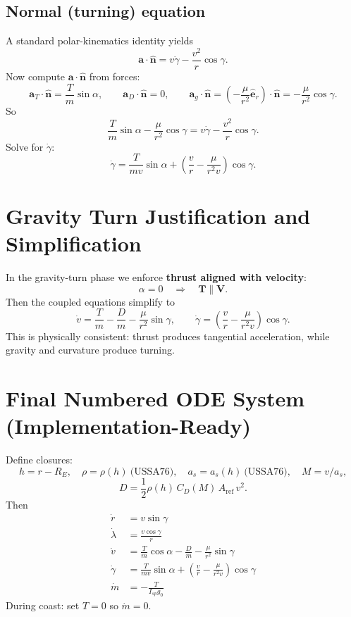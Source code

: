 \documentclass[11pt]{article}
\begin{document}
\subsection{Normal (turning) equation}
A standard polar-kinematics identity yields
\begin{equation}
\bm{a}\cdot\hat{\bm n}=v\dot\gamma-\frac{v^2}{r}\cos\gamma.
\end{equation}
Now compute $\bm{a}\cdot\hat{\bm n}$ from forces:
\[
\bm{a}_T\cdot\hat{\bm n}=\frac{T}{m}\sin\alpha,\qquad
\bm{a}_D\cdot\hat{\bm n}=0,\qquad
\bm{a}_g\cdot\hat{\bm n}=\left(-\frac{\mu}{r^2}\hat{\bm e}_r\right)\cdot\hat{\bm n}=-\frac{\mu}{r^2}\cos\gamma.
\]
So
\[
\frac{T}{m}\sin\alpha-\frac{\mu}{r^2}\cos\gamma=v\dot\gamma-\frac{v^2}{r}\cos\gamma.
\]
Solve for $\dot\gamma$:
\begin{equation}
\boxed{\dot\gamma=\frac{T}{mv}\sin\alpha+\left(\frac{v}{r}-\frac{\mu}{r^2v}\right)\cos\gamma.}
\end{equation}

\section{Gravity Turn Justification and Simplification}
In the gravity-turn phase we enforce \textbf{thrust aligned with velocity}:
\begin{equation}
\boxed{\alpha=0\quad\Rightarrow\quad \bm{T}\parallel\bm{V}.}
\end{equation}
Then the coupled equations simplify to
\begin{equation}
\boxed{\dot v=\frac{T}{m}-\frac{D}{m}-\frac{\mu}{r^2}\sin\gamma},
\qquad
\boxed{\dot\gamma=\left(\frac{v}{r}-\frac{\mu}{r^2v}\right)\cos\gamma}.
\end{equation}
This is physically consistent: thrust produces tangential acceleration, while gravity and curvature produce turning.

\section{Final Numbered ODE System (Implementation-Ready)}
Define closures:
\[
h=r-R_E,\quad \rho=\rho(h)\ \text{(USSA76)},\quad a_s=a_s(h)\ \text{(USSA76)},\quad M=v/a_s,
\]
\[
D=\frac{1}{2}\rho(h)\,C_D(M)\,A_{\text{ref}}\,v^2.
\]
Then
\begin{align}
\boxed{\dot r} &= \boxed{v\sin\gamma} \label{eq:r}\\
\boxed{\dot\lambda} &= \boxed{\frac{v\cos\gamma}{r}} \label{eq:lambda}\\
\boxed{\dot v} &= \boxed{\frac{T}{m}\cos\alpha-\frac{D}{m}-\frac{\mu}{r^2}\sin\gamma} \label{eq:v}\\
\boxed{\dot\gamma} &= \boxed{\frac{T}{mv}\sin\alpha+\left(\frac{v}{r}-\frac{\mu}{r^2v}\right)\cos\gamma} \label{eq:gamma}\\
\boxed{\dot m} &= \boxed{-\frac{T}{I_{sp}g_0}} \label{eq:m}
\end{align}
During coast: set $T=0$ so $\dot m=0$.
\end{document}

